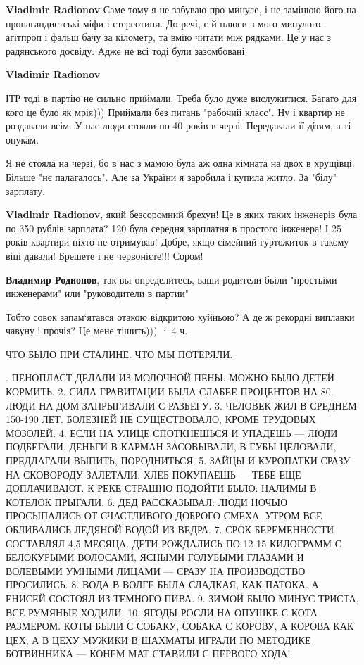 \begin{itemize}
\begin{itemize}

\textbf{Vladimir Radionov} Саме тому я не забуваю про минуле, і не замінюю його на пропагандистські міфи і стереотипи. До речі, є й плюси з мого минулого - агітпроп і фальш бачу за кілометр, та вмію читати між рядками. Це у нас з радянського досвіду. Адже не всі тоді були зазомбовані.

\textbf{Vladimir Radionov} 

ІТР тоді в партію не сильно приймали. Треба було дуже вислужитися. Багато для
кого це було як мрія))) Приймали без питань "рабочий класс". Ну і квартир не
роздавали всім. У нас люди стояли по 40 років в черзі. Передавали її дітям, а
ті онукам.

Я не стояла на черзі, бо в нас з мамою була аж одна кімната на двох в хрущівці.
Більше "нє палагалось". Але за України я заробила і купила житло. За "білу"
зарплату.

\textbf{Vladimir Radionov}, який безсоромний брехун! Це в яких таких інженерів була по 350 рублів зарплата? 120 була середня зарплатня в простого інженера! І 25 років квартири ніхто не отримував! Добре, якщо сімейний гуртожиток в такому віці давали! Брешете і не червонієте!!! Сором!

\textbf{Владимир Родионов}, так вьі определитесь, ваши родители бьіли "простьіми инженерами" или "руководители в партии"

\end{itemize} %

Тобто совок запам‘ятався отакою відкритою хуйньою? А де ж рекордні виплавки чавуну і прочія? Це мене тішить)))
 · 4 ч.

ЧТО БЫЛО ПРИ СТАЛИНЕ. ЧТО МЫ ПОТЕРЯЛИ.

. ПЕНОПЛАСТ ДЕЛАЛИ ИЗ МОЛОЧНОЙ ПЕНЫ. МОЖНО БЫЛО ДЕТЕЙ КОРМИТЬ.
2. СИЛА ГРАВИТАЦИИ БЫЛА СЛАБЕЕ ПРОЦЕНТОВ НА 80. ЛЮДИ НА ДОМ ЗАПРЫГИВАЛИ С РАЗБЕГУ.
3. ЧЕЛОВЕК ЖИЛ В СРЕДНЕМ 150-190 ЛЕТ. БОЛЕЗНЕЙ НЕ СУЩЕСТВОВАЛО, КРОМЕ ТРУДОВЫХ МОЗОЛЕЙ.
4. ЕСЛИ НА УЛИЦЕ СПОТКНЕШЬСЯ И УПАДЕШЬ — ЛЮДИ ПОДБЕГАЛИ, ДЕНЬГИ В КАРМАН ЗАСОВЫВАЛИ, В ГУБЫ ЦЕЛОВАЛИ, ПРЕДЛАГАЛИ ВЫПИТЬ, ПОРОДНИТЬСЯ.
5. ЗАЙЦЫ И КУРОПАТКИ СРАЗУ НА СКОВОРОДУ ЗАЛЕТАЛИ.
ХЛЕБ ПОКУПАЕШЬ — ТЕБЕ ЕЩЕ ДОПЛАЧИВАЮТ.
К РЕКЕ СТРАШНО ПОДОЙТИ БЫЛО: НАЛИМЫ В КОТЕЛОК ПРЫГАЛИ.
6. ДЕД РАССКАЗЫВАЛ: ЛЮДИ НОЧЬЮ ПРОСЫПАЛИСЬ ОТ СЧАСТЛИВОГО ДОБРОГО СМЕХА. УТРОМ ВСЕ ОБЛИВАЛИСЬ ЛЕДЯНОЙ ВОДОЙ ИЗ ВЕДРА.
7. СРОК БЕРЕМЕННОСТИ СОСТАВЛЯЛ 4,5 МЕСЯЦА. ДЕТИ РОЖДАЛИСЬ ПО 12-15 КИЛОГРАММ С БЕЛОКУРЫМИ ВОЛОСАМИ, ЯСНЫМИ ГОЛУБЫМИ ГЛАЗАМИ И ВОЛЕВЫМИ УМНЫМИ ЛИЦАМИ — СРАЗУ НА ПРОИЗВОДСТВО ПРОСИЛИСЬ.
8. ВОДА В ВОЛГЕ БЫЛА СЛАДКАЯ, КАК ПАТОКА. А ЕНИСЕЙ СОСТОЯЛ ИЗ ТЕМНОГО ПИВА.
9. ЗИМОЙ БЫЛО МИНУС ТРИСТА, ВСЕ РУМЯНЫЕ ХОДИЛИ.
10. ЯГОДЫ РОСЛИ НА ОПУШКЕ С КОТА РАЗМЕРОМ. КОТЫ БЫЛИ С СОБАКУ, СОБАКА С КОРОВУ, А КОРОВА КАК ЦЕХ, А В ЦЕХУ МУЖИКИ В ШАХМАТЫ ИГРАЛИ ПО МЕТОДИКЕ БОТВИННИКА — КОНЕМ МАТ СТАВИЛИ С ПЕРВОГО ХОДА!
\restorecr


\end{itemize}
